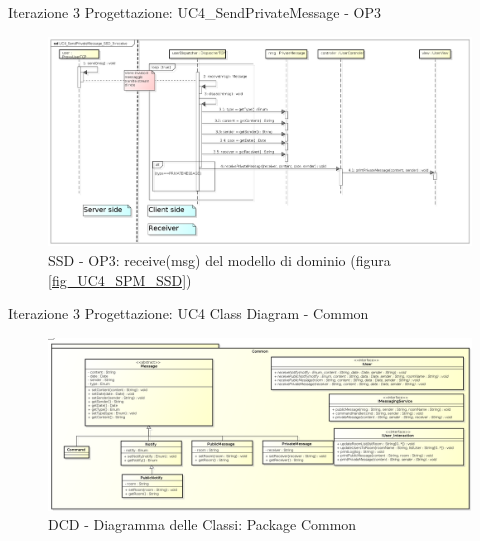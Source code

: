 \documentclass[t]{beamer} %
\begin{document}
\begin{frame} {Iterazione 3 Progettazione: UC4\_SendPrivateMessage - OP3}
   \begin{figure}
     \includegraphics[scale=0.22]{image_astah/Iteration_3_DesignModel/UC4_SendPrivateMessage_SSD_3_receive.png}{\centering}
     \caption{SSD - OP3: receive(msg) del modello di dominio (figura \ref{fig_UC4_SPM_SSD})}
     \label{fig_UC4_SSD_SRM_3} 
   \end{figure}
\end{frame}

\begin{frame} {Iterazione 3 Progettazione: UC4 Class Diagram - Common}
   \begin{figure}
     \includegraphics[scale=0.215]{image_astah/Iteration_3_DesignModel/ClassDiagramCommon.png}{\centering}
     \caption{DCD - Diagramma delle Classi: Package Common }
     \label{fig_UC4_DCD_1} 
   \end{figure}
\end{frame}
\end{document}
